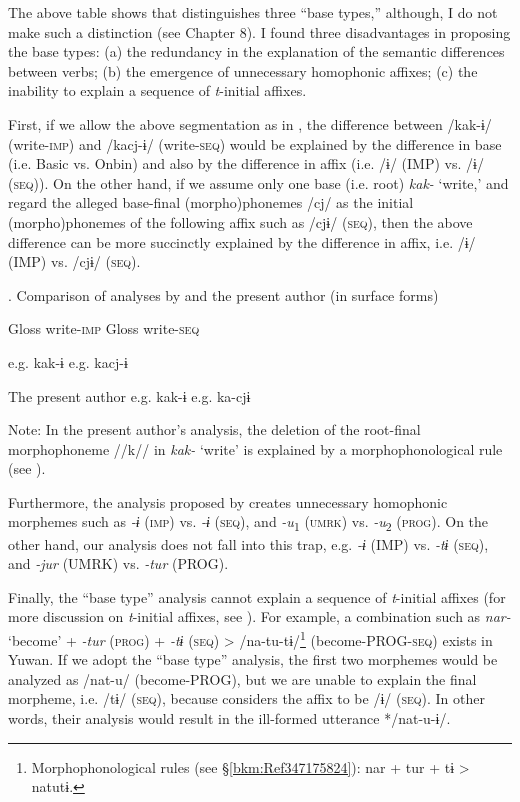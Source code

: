 The above table shows that \citet{UchimaEtAl1976} distinguishes three “base types,” although, I do not make such a distinction (see Chapter 8). I found three disadvantages in proposing the base types: (a) the redundancy in the explanation of the semantic differences between verbs; (b) the emergence of unnecessary homophonic affixes; (c) the inability to explain a sequence of \textit{t}-initial affixes.

First, if we allow the above segmentation as in , the difference between /kak-ɨ/ (write-\textsc{imp}) and /kacj-ɨ/ (write-\textsc{seq}) would be explained by the difference in base (i.e. Basic vs. Onbin) and also by the difference in affix (i.e. /ɨ/ (IMP) vs. /ɨ/ (\textsc{seq})). On the other hand, if we assume only one base (i.e. root) \textit{kak-} ‘write,’ and regard the alleged base-final (morpho)phonemes /cj/ as the initial (morpho)phonemes of the following affix such as /cjɨ/ (\textsc{seq}), then the above difference can be more succinctly explained by the difference in affix, i.e. /ɨ/ (IMP) vs. /cjɨ/ (\textsc{seq}).

\begin{table}
\caption{\label{tab:key:69}. Comparison of analyses by \citet{UchimaEtAl1976} and the present author (in surface forms)}

  Gloss  write-\textsc{imp}    Gloss  write-\textsc{seq}

\citet{UchimaEtAl1976}  e.g.  kak-ɨ    e.g.  kacj-ɨ

The present author  e.g.  kak-ɨ    e.g.  ka-cjɨ

Note: In the present author’s analysis, the deletion of the root-final morphophoneme //k// in \textit{kak-} ‘write’ is explained by a morphophonological rule (see ).
\end{table}

  Furthermore, the analysis proposed by \citet{UchimaEtAl1976} creates unnecessary homophonic morphemes such as \textit{-ɨ} (\textsc{imp}) vs. \textit{-ɨ} (\textsc{seq}), and \textit{-u}\textsubscript{1} (\textsc{umrk}) vs. \textit{-u}\textsubscript{2} (\textsc{prog}). On the other hand, our analysis does not fall into this trap, e.g. \textit{-ɨ} (IMP) vs. \textit{-tɨ} (\textsc{seq}), and \textit{-jur} (UMRK) vs. \textit{-tur} (PROG).

  Finally, the “base type” analysis cannot explain a sequence of \textit{t}-initial affixes (for more discussion on \textit{t}-initial affixes, see ). For example, a combination such as \textit{nar-} ‘become’ + \textit{-tur} (\textsc{prog}) + \textit{-tɨ} (\textsc{seq}) > /na-tu-tɨ/\footnote{Morphophonological rules (see §\ref{bkm:Ref347175824}): nar + tur + tɨ > natutɨ.} (become-PROG-\textsc{seq}) exists in Yuwan. If we adopt the “base type” analysis, the first two morphemes would be analyzed as /nat-u/ (become-PROG), but we are unable to explain the final morpheme, i.e. /tɨ/ (\textsc{seq}), because \citet[91-92]{UchimaEtAl1976} considers the affix to be /ɨ/ (\textsc{seq}). In other words, their analysis would result in the ill-formed utterance */nat-u-ɨ/.

